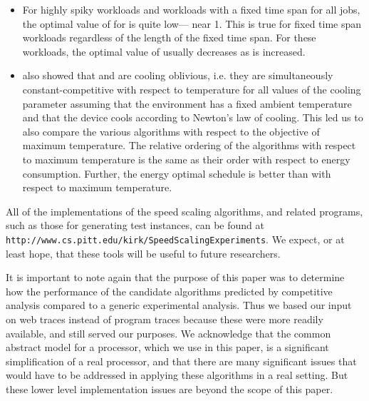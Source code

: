 \documentclass[11pt]{article}
\newcommand{\mycomment}[1]{ }
\begin{document}
\begin{itemize}
\item For highly spiky workloads and workloads with a fixed time span
  for all jobs, the optimal value of  for  is quite low---
  near 1.
  This is true for fixed time span workloads regardless of the length
  of the fixed time span. 
  For these workloads, the optimal value of  usually decreases as
   is increased.
\mycomment{
\item As  is increased, optimal  of  usually decreases
  for highly spiky and fixed time span workloads. For both types of
  workload optimal  is quite low - near 1 - which means that
  running faster is not beneficial, and with a greater value of
   even more energy is consumed that it makes sense to use
  smaller values of  to reduce consumed energy.
}

\item
\cite{BKP} also showed that  and  are cooling oblivious, i.e.
they are simultaneously constant-competitive with
respect to temperature for all values of the cooling parameter
assuming that the environment
has a fixed ambient temperature and that the device cools
according to Newton's law of cooling.
This led us to also compare the various algorithms with respect to 
the objective of maximum temperature.
The relative ordering of the algorithms with respect to maximum
temperature is the same as their order with
respect to energy consumption. Further, the energy optimal schedule  is better
than  with respect to maximum temperature.

\end{itemize}
All of the implementations of the speed scaling algorithms, and related programs, such as 
those for generating test instances, can be found at 
{\tt http://www.cs.pitt.edu/kirk/SpeedScalingExperiments}.
We expect, or at least hope, that these tools will be useful to future researchers.


It is important to note again that the purpose of this paper was to determine how
the performance of the candidate algorithms predicted by competitive
analysis compared to a generic experimental analysis.
Thus we based our input on web traces instead of program traces because
these were more readily available, and still served our purposes.
We acknowledge that the common abstract model for a processor, which we
use in this paper, is a significant simplification of a real processor, and 
that there
are many significant issues that would  have to be addressed in applying
these algorithms in a real setting. But these lower level implementation 
issues are beyond the scope of
this paper.
\end{document}
